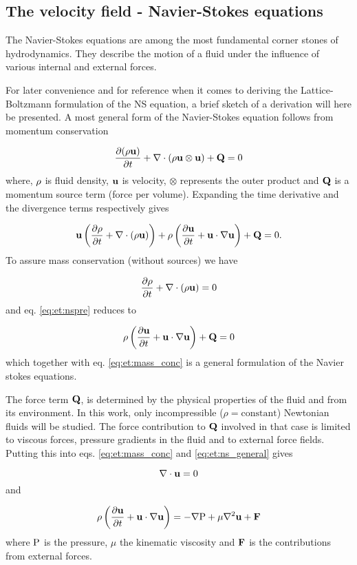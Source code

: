 \subsection{The velocity field - Navier-Stokes equations}\label{sec:et:ns}
The Navier-Stokes equations are among the most fundamental corner
stones of hydrodynamics. They describe the motion of a fluid under
the influence of various internal and external forces.

For later convenience and for reference when it comes to deriving the
Lattice-Boltzmann formulation of the NS equation, a brief sketch of a
derivation will here be presented. A most general form of the
Navier-Stokes equation follows from momentum conservation

\begin{equation}
\dfrac{\partial (\mathrm{\rho} \mathbf{u})}{\partial t} + \nabla \cdot (\rho \mathbf{u}
\otimes \mathbf{u}) + \mathbf{Q} = 0 
\end{equation}
where, $\mathrm{\rho}$ is fluid density, $\mathbf{u}$ is velocity, $\otimes$
represents the outer product and $\mathbf{Q}$ is a momentum source term
(force per volume). Expanding the time derivative and the divergence
terms respectively gives
 
\begin{equation}\label{eq:et:nspre}
\mathbf{u} \left ( \dfrac{\partial \mathrm{\rho}}{\partial t} + \nabla \cdot
  (\mathrm{\rho} \mathbf{u}) \right ) + \mathrm{\rho} \left (\dfrac{\partial \mathbf{u}}{\partial t} +
  \mathbf{u} \cdot \nabla \mathbf{u} 
  \right ) + \mathbf{Q} = 0.
\end{equation}
To assure mass conservation (without sources) we have

\begin{equation}\label{eq:et:mass_conc}
 \dfrac{\partial \mathrm{\rho}}{\partial t} + \nabla \cdot(
  \mathrm{\rho} \mathbf{u}) = 0
\end{equation}
and eq. \eqref{eq:et:nspre} reduces to

\begin{equation}\label{eq:et:ns_general} 
\mathrm{\rho} \left (\dfrac{\partial \mathbf{u}}{\partial t} +
  \mathbf{u} \cdot \nabla \mathbf{u} 
  \right ) + \mathbf{Q} = 0
\end{equation}
which together with eq. \eqref{eq:et:mass_conc} is a general
formulation of the Navier stokes equations. 

The force term $\mathbf{Q}$, is determined by the physical properties of the
fluid and from its environment. In this work, only incompressible
($\rho = \mbox{constant}$) Newtonian fluids will be studied. The force
contribution to $\mathbf{Q}$ involved in that case is limited to viscous
forces, pressure gradients in the fluid and to external force
fields. Putting this into eqs. \eqref{eq:et:mass_conc} and
\eqref{eq:et:ns_general} gives

\begin{equation}\label{eq:et:ns_incompressible}
 \nabla \cdot \mathbf{u} = 0
\end{equation}
and

\begin{equation}\label{eq:et:ns_mom}
\mathrm{\rho} \left (\dfrac{\partial \mathbf{u}}{\partial t} +
  \mathbf{u} \cdot \nabla \mathbf{u} 
  \right ) = - \nabla \mathrm{P}  + \mu \nabla^2 \mathbf{u} + \mathbf{F}
\end{equation}
where $\mathrm{P}$ is the pressure, $\mu$ the kinematic viscosity and $\mathbf{F}$
is the contributions from  external forces.
